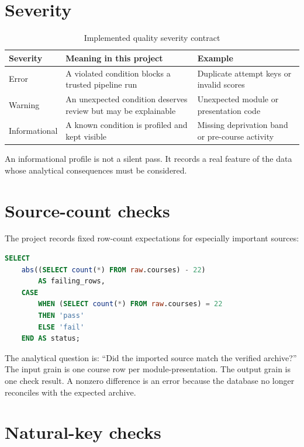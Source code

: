 \section{Severity}

\begin{table}[htbp]
\centering
\caption{Implemented quality severity contract}
\label{tab:severity}
\begin{tabularx}{\textwidth}{L{0.18\textwidth}L{0.29\textwidth}Y}
\toprule
Severity & Meaning in this project & Example \\
\midrule
Error & A violated condition blocks a trusted pipeline run & Duplicate attempt keys or invalid scores \\
Warning & An unexpected condition deserves review but may be explainable & Unexpected module or presentation code \\
Informational & A known condition is profiled and kept visible & Missing deprivation band or pre-course activity \\
\bottomrule
\end{tabularx}
\end{table}

An informational profile is not a silent pass. It records a real feature of the
data whose analytical consequences must be considered.

\section{Source-count checks}

The project records fixed row-count expectations for especially important
sources:

\begin{lstlisting}[language=SQL,caption={Simplified form of an implemented
source-count check.}]
SELECT
    abs((SELECT count(*) FROM raw.courses) - 22)
        AS failing_rows,
    CASE
        WHEN (SELECT count(*) FROM raw.courses) = 22
        THEN 'pass'
        ELSE 'fail'
    END AS status;
\end{lstlisting}

The analytical question is: ``Did the imported source match the verified
archive?'' The input grain is one course row per module-presentation. The
output grain is one check result. A nonzero difference is an error because the
database no longer reconciles with the expected archive.

\section{Natural-key checks}


